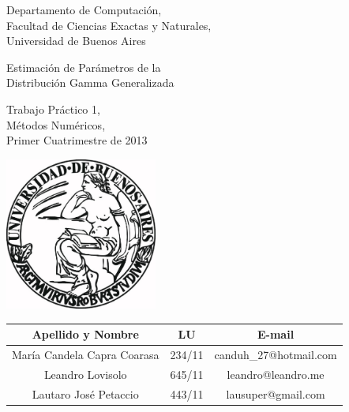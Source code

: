 \documentclass[a4paper,10pt,twoside]{article}
\begin{document}


\thispagestyle{caratula}

\begin{center}

Departamento de Computación,\\
Facultad de Ciencias Exactas y Naturales,\\
Universidad de Buenos Aires

\begin{spacing}{2.5}
\begin{Huge}
Estimación de Parámetros de la\\
Distribución Gamma Generalizada
\end{Huge}
\end{spacing}

\vspace{1cm}

Trabajo Práctico 1, \\
Métodos Numéricos, \\
Primer Cuatrimestre de 2013

\vspace{1cm}

\includegraphics[width=5cm]{UBA.jpg} 

\vspace{1cm}

\begin{tabular}{|c|c|c|}
\hline
Apellido y Nombre & LU & E-mail\\
\hline
María Candela Capra Coarasa & 234/11 & canduh\_27@hotmail.com\\
Leandro Lovisolo            & 645/11 & leandro@leandro.me\\
Lautaro José Petaccio       & 443/11 & lausuper@gmail.com\\
\hline
\end{tabular}

\vspace{2cm}

\end{center}
\end{document}
